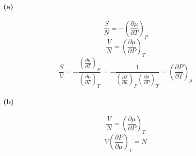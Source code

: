 \documentclass{article}
\begin{document}
\paragraph{(a)}
\[\frac{S}{N}=-\left(\frac{\partial \mu }{\partial T}\right)_{P}\]
\[\frac{V}{N}=\left(\frac{\partial \mu }{\partial P}\right)_{T}\]
\[\frac{S}{V}=-\frac{\left(\frac{\partial \mu }{\partial T}\right)_{P}}{\left(\frac{\partial \mu }{\partial P}\right)_{T}}=
-\frac{1}{\left(\frac{\partial T}{\partial \mu }\right)_{P} \left(\frac{\partial \mu }{\partial P}\right)_{T}}=
\left(\frac{\partial P}{\partial T}\right)_{\mu }\]
\paragraph{(b)}
\[\frac{V}{N}=\left(\frac{\partial \mu }{\partial P}\right)_{T}\]
\[V \left (\frac{\partial P}{\partial \mu} \right )_{T}=N\]
\end{document}
